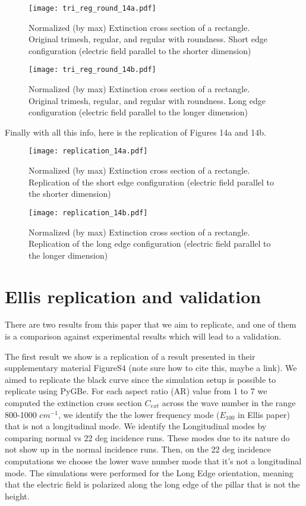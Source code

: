 \begin{figure}
    \centering
    \texttt{[image: tri\_reg\_round\_14a.pdf]} 
    \caption{Normalized (by max) Extinction cross section of a rectangle. Original trimesh, regular, and regular with 
    roundness. Short edge configuration (electric field parallel to the shorter dimension)}
    \label{fig:tri_reg_round_14a}
 \end{figure}

 \begin{figure}
    \centering
    \texttt{[image: tri\_reg\_round\_14b.pdf]} 
    \caption{Normalized (by max) Extinction cross section of a rectangle.  Original trimesh, regular, and regular with 
    roundness. Long edge configuration (electric field parallel to the longer dimension)}
    \label{fig:tri_reg_round_14b}
 \end{figure}


 Finally with all this info, here is the replication of Figures 14a and 14b. 

 \begin{figure}
    \centering
    \texttt{[image: replication\_14a.pdf]} 
    \caption{Normalized (by max) Extinction cross section of a rectangle. Replication of 
    the short edge configuration (electric field parallel to the shorter dimension)}
    \label{fig:rep_14a}
 \end{figure}

 \begin{figure}
    \centering
    \texttt{[image: replication\_14b.pdf]} 
    \caption{Normalized (by max) Extinction cross section of a rectangle. Replication of the 
    long edge configuration (electric field parallel to the longer dimension)}
    \label{fig:rep_14b}
 \end{figure}

 \section{Ellis replication and validation}

There are two results from this paper that we aim to replicate, and one of them is a comparison
against experimental results which will lead to a validation. 

The first result we show is a replication of a result presented in their supplementary 
material FigureS4 {\color{red}(note sure how to cite this, maybe a link)}. We aimed to replicate the 
black curve since the simulation setup is possible to replicate using PyGBe. For each aspect ratio (AR) 
value from 1 to 7 we computed the extinction cross section $C_{ext}$ across the wave number in the range
800-1000 $cm^{-1}$, we identify the the lower frequency mode ($E_{100}$ in Ellis paper)  that is not a 
longitudinal mode. We identify the Longitudinal modes by comparing normal vs 22 deg incidence runs. These
modes due to its nature do not show up in the normal incidence runs. Then, on the 22 deg incidence 
computations we choose the lower wave number mode that it's not a longitudinal mode. The simulations were 
performed for the Long Edge orientation, meaning that the electric field is polarized along the long edge 
of the pillar that is not the height. 

